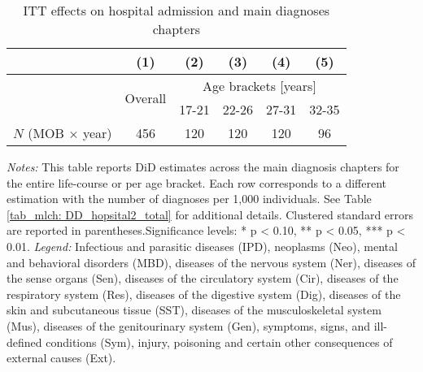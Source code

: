 
\restoregeometry





\newpage
{} 
\vspace*{\fill}
\begin{table}[H] \centering 
	\begin{threeparttable} \centering \caption{ITT effects on hospital admission and main diagnoses chapters}\label{tab_mlch: ITT_across_chapters_per_age_group_total}
		{\def\sym#1{\ifmmode^{#1}\else\(^{#1}\)\fi} 
			\begin{tabular}{l*{5}{c}}
				\toprule 
				&\multicolumn{1}{c}{(1)}&\multicolumn{1}{c}{(2)}&\multicolumn{1}{c}{(3)}&\multicolumn{1}{c}{(4)}&\multicolumn{1}{c}{(5)}\\
				\midrule
				&\multirow{2}{*}{Overall} & \multicolumn{4}{c}{Age brackets [years]} \\ 
				\cmidrule(lr){3-6}
				&&\multicolumn{1}{c}{17-21}&\multicolumn{1}{c}{22-26}&\multicolumn{1}{c}{27-31}&\multicolumn{1}{c}{32-35}\\
				
				\midrule
				
				
				\midrule
				\(N\) (MOB $\times$ year)& 456 & 120 & 120 & 120 & 96\\
				\bottomrule 
		\end{tabular}}
	\end{threeparttable} 
	\begin{minipage}{0.95\linewidth}
		\scriptsize \emph{Notes:} This table reports DiD estimates across the main diagnosis chapters for the entire life-course or per age bracket. Each row corresponds to a different estimation with the number of diagnoses per 1,000 individuals. See Table \ref{tab_mlch: DD_hopsital2_total} for additional details. Clustered standard errors are reported in parentheses.\newline Significance levels: * p < 0.10, ** p < 0.05, *** p < 0.01.\newline
		\emph{Legend:} Infectious and parasitic diseases (IPD), neoplasms (Neo), mental and behavioral disorders (MBD), diseases of the nervous system (Ner), diseases of the sense organs (Sen), diseases of the circulatory system (Cir), diseases of the respiratory system (Res), diseases of the digestive system (Dig), diseases of the skin and subcutaneous tissue (SST), diseases of the musculoskeletal system (Mus), diseases of the genitourinary system (Gen), symptoms, signs, and ill-defined conditions (Sym), injury, poisoning and certain other consequences of external causes (Ext).\newline %
	\end{minipage}
\end{table} 
